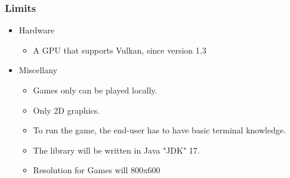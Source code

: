 \subsubsection{Limits}
\begin{itemize}
    \item Hardware
    \begin{itemize}
        \item A GPU that supports Vulkan, since version 1.3
    \end{itemize}
    \item Miscellany
    \begin{itemize}
        \item Games only can be played locally.
        \item Only 2D graphics.
        \item To run the game, the end-user has to have basic terminal knowledge.
        \item The library will be written in Java "JDK" 17.
        \item Resolution for Games will 800x600
    \end{itemize}
\end{itemize}
